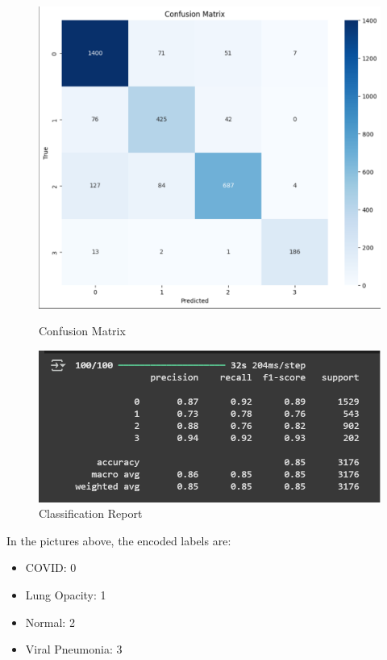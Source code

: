 \documentclass{article}
\begin{document}
\begin{figure}[H]
    \centering
    \begin{minipage}[t]{0.48\textwidth}
        \centering
        \includegraphics[width=\linewidth]{DN121cm2.png}
        \caption{Confusion Matrix}
        \label{fig:DN121cm2}
    \end{minipage}
    \hfill
    \begin{minipage}[t]{0.48\textwidth}
        \centering
        \includegraphics[width=\linewidth]{DN121cr2.png}
        \caption{Classification Report}
        \label{fig:DN121cr2}
    \end{minipage}
\end{figure}

In the pictures above, the encoded labels are:
\begin{itemize}
    \item COVID: 0
    \item Lung Opacity: 1
    \item Normal: 2
    \item Viral Pneumonia: 3
\end{itemize}
\end{document}
